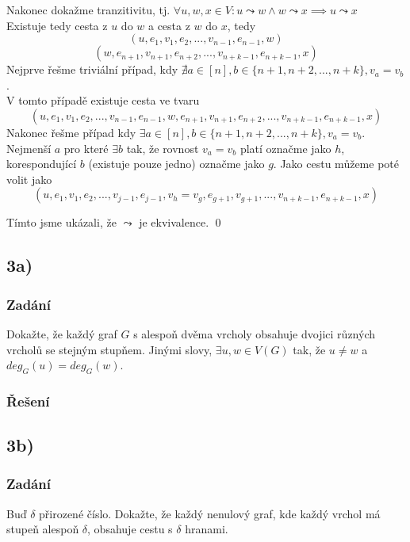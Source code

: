 \documentclass[../main.tex]{subfiles}
\begin{document}
Nakonec dokažme tranzitivitu, tj. $\forall u,w,x\in V: u\leadsto w \wedge w\leadsto x \implies u\leadsto x$\\
Existuje tedy cesta z $u$ do $w$ a cesta z $w$ do $x$, tedy
\begin{equation*}
    (u, e_1, v_1, e_2, ..., v_{n-1}, e_{n-1}, w)
\end{equation*}
\begin{equation*}
    (w, e_{n+1}, v_{n+1}, e_{n+2}, ..., v_{n+k-1}, e_{n+k-1}, x)
\end{equation*}
Nejprve řešme triviální případ, kdy $\nexists a \in [n], b \in \{n+1, n+2, ..., n+k\}, v_a = v_b$ .\\
V tomto případě existuje cesta ve tvaru
\begin{equation*}
    (u, e_1, v_1, e_2, ..., v_{n-1}, e_{n-1}, w, e_{n+1}, v_{n+1}, e_{n+2}, ..., v_{n+k-1}, e_{n+k-1}, x)
\end{equation*} 
Nakonec řešme případ kdy $\exists a \in [n], b \in \{n+1, n+2, ..., n+k\}, v_a = v_b$.\\
Nejmenší $a$ pro které $\exists b$ tak, že rovnost $v_a = v_b$ platí označme jako $h$, korespondující $b$ (existuje pouze jedno) označme jako $g$.
Jako cestu můžeme poté volit jako
\begin{equation*}
    (u, e_1, v_1, e_2, ..., v_{j-1}, e_{j-1}, v_h = v_g , e_{g+1}, v_{g+1},..., v_{n+k-1}, e_{n+k-1}, x)
\end{equation*} 

Tímto jsme ukázali, že $\leadsto$ je ekvivalence.  
\qed


\subsection*{3a)}
\subsubsection*{Zadání}
Dokažte, že každý graf $G$ s alespoň dvěma vrcholy obsahuje dvojici různých vrcholů se stejným stupňem. Jinými slovy, $\exists u,w \in V(G)$
tak, že $u\neq w$ a $deg_G(u) = deg_G(w)$.
\subsubsection*{Řešení}


\subsection*{3b)}
\subsubsection*{Zadání}
Buď $\delta$ přirozené číslo. Dokažte, že každý nenulový graf, kde každý vrchol má stupeň alespoň $\delta$, obsahuje cestu s $\delta$ hranami.
\end{document}
